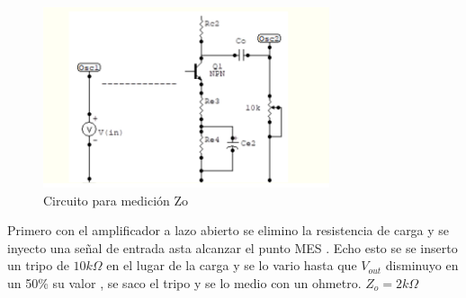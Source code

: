 \documentclass[12pt, letterpaper]{article}
\begin{document}
\singlespacing
\begin{figure}[H]
	\centering
	\includegraphics[width=0.75\textwidth]{Imagenes/zo.png}

	\caption{Circuito para medición Zo}
	\label{fig:med_Zo}
\end{figure}
Primero con el amplificador a lazo abierto se elimino la resistencia de carga y se inyecto una señal de entrada asta alcanzar el punto MES . Echo esto se se inserto un tripo de $10k\Omega$ en el lugar de la carga y se lo vario hasta que $V_{out}$ disminuyo en un 50\% su valor , se saco el tripo y se lo medio con un ohmetro.
\singlespacing
$Z_o=2k\Omega$
\singlespacing
\end{document}

